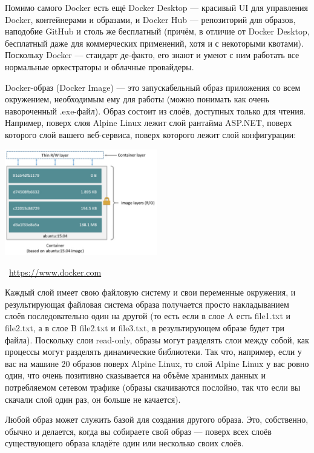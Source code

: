 \documentclass[a5paper]{article}
\newcommand{\attribution}[1] {
    \vspace{-5mm}\begin{flushright}\begin{scriptsize}\textcolor{gray}{\textcopyright\, #1}\end{scriptsize}\end{flushright}
}
\begin{document}
Помимо самого Docker есть ещё Docker Desktop --- красивый UI для управления Docker, контейнерами и образами, и Docker Hub --- репозиторий для образов, наподобие GitHub и столь же бесплатный (причём, в отличие от Docker Desktop, бесплатный даже для коммерческих применений, хотя и с некоторыми квотами). Поскольку Docker --- стандарт де-факто, его знают и умеют с ним работать все нормальные оркестраторы и облачные провайдеры.

Docker-образ (Docker Image) --- это запускабельный образ приложения со всем окружением, необходимым ему для работы (можно понимать как очень навороченный .exe-файл). Образ состоит из слоёв, доступных только для чтения. Например, поверх слоя Alpine Linux лежит слой рантайма ASP.NET, поверх которого слой вашего веб-сервиса, поверх которого лежит слой конфигурации:

\begin{center}
    \includegraphics[width=0.5\textwidth]{dockerLayers.png}
    \attribution{\url{ https://www.docker.com}}
\end{center}

Каждый слой имеет свою файловую систему и свои переменные окружения, и результирующая файловая система образа получается просто накладыванием слоёв последовательно один на другой (то есть если в слое A есть file1.txt и file2.txt, а в слое B file2.txt и file3.txt, в результирующем образе будет три файла). Поскольку слои read-only, образы могут разделять слои между собой, как процессы могут разделять динамические библиотеки. Так что, например, если у вас на машине 20 образов поверх Alpine Linux, то слой Alpine Linux у вас ровно один, что очень позитивно сказывается на объёме хранимых данных и потребляемом сетевом трафике (образы скачиваются послойно, так что если вы скачали слой один раз, он больше не качается).

Любой образ может служить базой для создания другого образа. Это, собственно, обычно и делается, когда вы собираете свой образ --- поверх всех слоёв существующего образа кладёте один или несколько своих слоёв.
\end{document}
